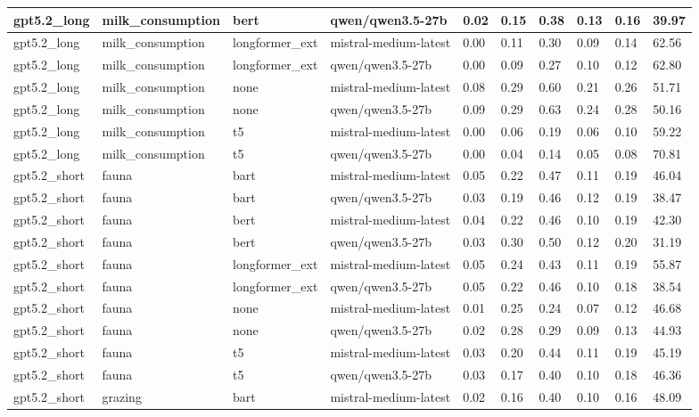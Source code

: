 \begin{tabular}{|l|l|l|l|l|l|l|l|l|l|}
 \hline
 gpt5.2\_long & milk\_consumption & bert & qwen/qwen3.5-27b & 0.02 & 0.15 & 0.38 & 0.13 & 0.16 & 39.97 \\
 \hline
 gpt5.2\_long & milk\_consumption & longformer\_ext & mistral-medium-latest & 0.00 & 0.11 & 0.30 & 0.09 & 0.14 & 62.56 \\
 \hline
 gpt5.2\_long & milk\_consumption & longformer\_ext & qwen/qwen3.5-27b & 0.00 & 0.09 & 0.27 & 0.10 & 0.12 & 62.80 \\
 \hline
 gpt5.2\_long & milk\_consumption & none & mistral-medium-latest & 0.08 & 0.29 & 0.60 & 0.21 & 0.26 & 51.71 \\
 \hline
 gpt5.2\_long & milk\_consumption & none & qwen/qwen3.5-27b & 0.09 & 0.29 & 0.63 & 0.24 & 0.28 & 50.16 \\
 \hline
 gpt5.2\_long & milk\_consumption & t5 & mistral-medium-latest & 0.00 & 0.06 & 0.19 & 0.06 & 0.10 & 59.22 \\
 \hline
 gpt5.2\_long & milk\_consumption & t5 & qwen/qwen3.5-27b & 0.00 & 0.04 & 0.14 & 0.05 & 0.08 & 70.81 \\
 \hline
 gpt5.2\_short & fauna & bart & mistral-medium-latest & 0.05 & 0.22 & 0.47 & 0.11 & 0.19 & 46.04 \\
 \hline
 gpt5.2\_short & fauna & bart & qwen/qwen3.5-27b & 0.03 & 0.19 & 0.46 & 0.12 & 0.19 & 38.47 \\
 \hline
 gpt5.2\_short & fauna & bert & mistral-medium-latest & 0.04 & 0.22 & 0.46 & 0.10 & 0.19 & 42.30 \\
 \hline
 gpt5.2\_short & fauna & bert & qwen/qwen3.5-27b & 0.03 & 0.30 & 0.50 & 0.12 & 0.20 & 31.19 \\
 \hline
 gpt5.2\_short & fauna & longformer\_ext & mistral-medium-latest & 0.05 & 0.24 & 0.43 & 0.11 & 0.19 & 55.87 \\
 \hline
 gpt5.2\_short & fauna & longformer\_ext & qwen/qwen3.5-27b & 0.05 & 0.22 & 0.46 & 0.10 & 0.18 & 38.54 \\
 \hline
 gpt5.2\_short & fauna & none & mistral-medium-latest & 0.01 & 0.25 & 0.24 & 0.07 & 0.12 & 46.68 \\
 \hline
 gpt5.2\_short & fauna & none & qwen/qwen3.5-27b & 0.02 & 0.28 & 0.29 & 0.09 & 0.13 & 44.93 \\
 \hline
 gpt5.2\_short & fauna & t5 & mistral-medium-latest & 0.03 & 0.20 & 0.44 & 0.11 & 0.19 & 45.19 \\
 \hline
 gpt5.2\_short & fauna & t5 & qwen/qwen3.5-27b & 0.03 & 0.17 & 0.40 & 0.10 & 0.18 & 46.36 \\
 \hline
 gpt5.2\_short & grazing & bart & mistral-medium-latest & 0.02 & 0.16 & 0.40 & 0.10 & 0.16 & 48.09 \\

\end{tabular}

